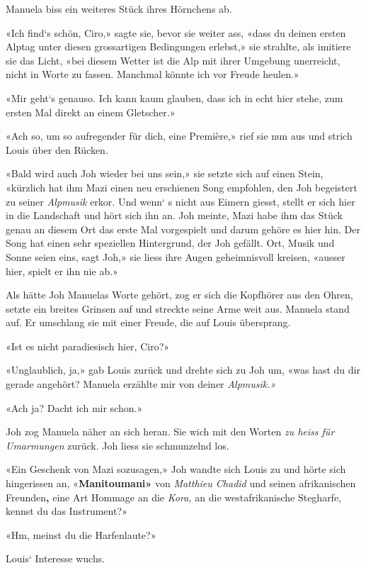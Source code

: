 Manuela biss ein weiteres Stück ihres Hörnchens ab.

«Ich find`s schön, Ciro,» sagte sie, bevor sie weiter ass, «dass du
deinen ersten Alptag unter diesen grossartigen Bedingungen erlebst,» sie
strahlte, als imitiere sie das Licht, «bei diesem Wetter ist die Alp mit
ihrer Umgebung unerreicht, nicht in Worte zu fassen. Manchmal könnte ich
vor Freude heulen.»

«Mir geht`s genauso. Ich kann kaum glauben, dass ich in echt hier stehe,
zum ersten Mal direkt an einem Gletscher.»

«Ach so, um so aufregender für dich, eine Première,» rief sie nun aus
und strich Louis über den Rücken.

«Bald wird auch Joh wieder bei uns sein,» sie setzte sich auf einen
Stein, «kürzlich hat ihm Mazi einen neu erschienen Song empfohlen, den
Joh begeistert zu seiner \emph{Alpmusik} erkor. Und wenn` s nicht aus
Eimern giesst, stellt er sich hier in die Landschaft und hört sich ihn
an. Joh meinte, Mazi habe ihm das Stück genau an diesem Ort das erste
Mal vorgespielt und darum gehöre es hier hin. Der Song hat einen sehr
speziellen Hintergrund, der Joh gefällt. Ort, Musik und Sonne seien
eins, sagt Joh,» sie liess ihre Augen geheimnisvoll kreisen, «ausser
hier, spielt er ihn nie ab.»

Als hätte Joh Manuelas Worte gehört, zog er sich die Kopfhörer aus den
Ohren, setzte ein breites Grinsen auf und streckte seine Arme weit aus.
Manuela stand auf. Er umschlang sie mit einer Freude, die auf Louis
übersprang.

«Ist es nicht paradiesisch hier, Ciro?»

«Unglaublich, ja,» gab Louis zurück und drehte sich zu Joh um, «was hast
du dir gerade angehört? Manuela erzählte mir von deiner
\emph{Alpmusik.»}

«Ach ja? Dacht ich mir schon.»

Joh zog Manuela näher an sich heran. Sie wich mit den Worten \emph{zu
heiss für Umarmungen} zurück. Joh liess sie schmunzelnd los.

«Ein Geschenk von Mazi sozusagen,» Joh wandte sich Louis zu und hörte
sich hingerissen an, «\textbf{Manitoumani»} von \emph{Matthieu Chadid}
und seinen afrikanischen Freunden\textbf{,} eine Art Hommage an die
\emph{Kora,} an die westafrikanische Stegharfe, kennst du das
Instrument?»

«Hm, meinst du die Harfenlaute?»

Louis` Interesse wuchs.

